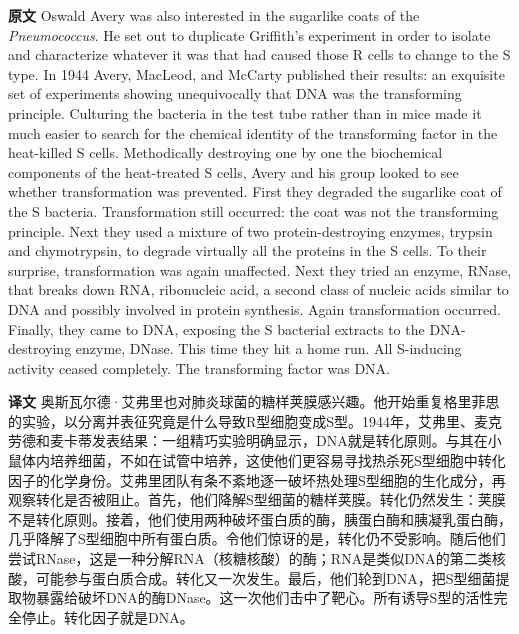 \documentclass[UTF8,zihao=-4]{ctexart}
\newcommand{\BodyFont}{\fontsize{10.5pt}{15.5pt}\selectfont}
\renewenvironment{quote}{\par\noindent\begingroup\BodyFont}{\par\endgroup}
\begin{document}
\begin{quote}
\noindent\textbf{原文} Oswald Avery was also interested in the sugarlike coats of the \emph{Pneumococcus}. He set out to duplicate Griffith's experiment in order to isolate and characterize whatever it was that had caused those R cells to change to the S type. In 1944 Avery, MacLeod, and McCarty published their results: an exquisite set of experiments showing unequivocally that DNA was the transforming principle. Culturing the bacteria in the test tube rather than in mice made it much easier to search for the chemical identity of the transforming factor in the heat-killed S cells. Methodically destroying one by one the biochemical components of the heat-treated S cells, Avery and his group looked to see whether transformation was prevented. First they degraded the sugarlike coat of the S bacteria. Transformation still occurred: the coat was not the transforming principle. Next they used a mixture of two protein-destroying enzymes, trypsin and chymotrypsin, to degrade virtually all the proteins in the S cells. To their surprise, transformation was again unaffected. Next they tried an enzyme, RNase, that breaks down RNA, ribonucleic acid, a second class of nucleic acids similar to DNA and possibly involved in protein synthesis. Again transformation occurred. Finally, they came to DNA, exposing the S bacterial extracts to the DNA-destroying enzyme, DNase. This time they hit a home run. All S-inducing activity ceased completely. The transforming factor was DNA.

\smallskip
\noindent\textbf{译文} 奥斯瓦尔德·艾弗里也对肺炎球菌的糖样荚膜感兴趣。他开始重复格里菲思的实验，以分离并表征究竟是什么导致R型细胞变成S型。1944年，艾弗里、麦克劳德和麦卡蒂发表结果：一组精巧实验明确显示，DNA就是转化原则。与其在小鼠体内培养细菌，不如在试管中培养，这使他们更容易寻找热杀死S型细胞中转化因子的化学身份。艾弗里团队有条不紊地逐一破坏热处理S型细胞的生化成分，再观察转化是否被阻止。首先，他们降解S型细菌的糖样荚膜。转化仍然发生：荚膜不是转化原则。接着，他们使用两种破坏蛋白质的酶，胰蛋白酶和胰凝乳蛋白酶，几乎降解了S型细胞中所有蛋白质。令他们惊讶的是，转化仍不受影响。随后他们尝试RNase，这是一种分解RNA（核糖核酸）的酶；RNA是类似DNA的第二类核酸，可能参与蛋白质合成。转化又一次发生。最后，他们轮到DNA，把S型细菌提取物暴露给破坏DNA的酶DNase。这一次他们击中了靶心。所有诱导S型的活性完全停止。转化因子就是DNA。
\end{quote}
\end{document}
